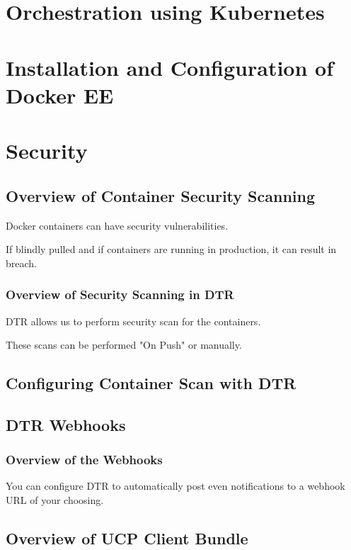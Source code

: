 \documentclass[11pt]{book}
\begin{document}
    \chapter{Orchestration using Kubernetes}

    \chapter{Installation and Configuration of Docker EE}

    \chapter{Security}

    \section{Overview of Container Security Scanning}
    Docker containers can have security vulnerabilities.

    If blindly pulled and if containers are running in production, it can result in breach.
    
    \subsection{Overview of Security Scanning in DTR}
    DTR allows us to perform security scan for the containers.

    These scans can be performed "On Push" or manually.

    \section{Configuring Container Scan with DTR}

    \section{DTR Webhooks}
    \subsection{Overview of the Webhooks}
    You can configure DTR to automatically post even notifications to a webhook URL of your choosing.

    \section{Overview of UCP Client Bundle}
\end{document}
